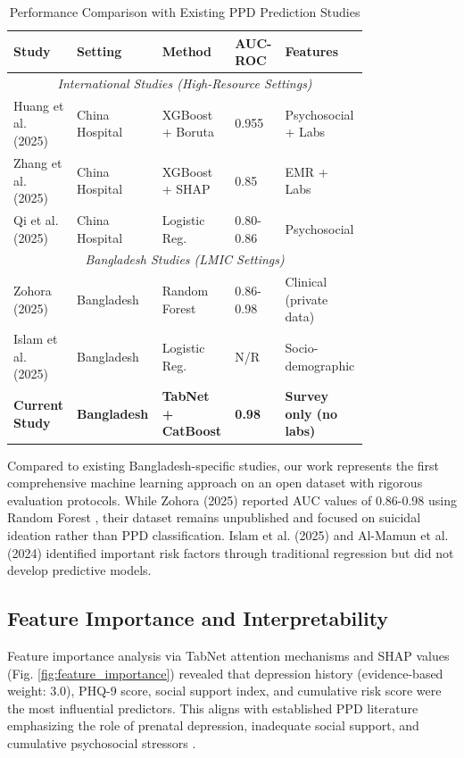 \begin{table}[htbp]
\centering
\caption{Performance Comparison with Existing PPD Prediction Studies}
\label{tab:comparison_literature}
\begin{tabular}{p{0.12\linewidth}p{0.18\linewidth}p{0.15\linewidth}p{0.12\linewidth}p{0.22\linewidth}}
\toprule
\textbf{Study} & \textbf{Setting} & \textbf{Method} & \textbf{AUC-ROC} & \textbf{Features} \\
\midrule
\multicolumn{5}{c}{\textit{International Studies (High-Resource Settings)}} \\
\midrule
Huang et al. (2025) & China Hospital & XGBoost + Boruta & 0.955 & Psychosocial + Labs \\
Zhang et al. (2025) & China Hospital & XGBoost + SHAP & 0.85 & EMR + Labs \\
Qi et al. (2025) & China Hospital & Logistic Reg. & 0.80-0.86 & Psychosocial \\
\midrule
\multicolumn{5}{c}{\textit{Bangladesh Studies (LMIC Settings)}} \\
\midrule
Zohora (2025) & Bangladesh & Random Forest & 0.86-0.98 & Clinical (private data) \\
Islam et al. (2025) & Bangladesh & Logistic Reg. & N/R & Socio-demographic \\
\midrule
\textbf{Current Study} & \textbf{Bangladesh} & \textbf{TabNet + CatBoost} & \textbf{0.98} & \textbf{Survey only (no labs)} \\
\bottomrule
\end{tabular}
\end{table}

Compared to existing Bangladesh-specific studies, our work represents the first comprehensive machine learning approach on an open dataset with rigorous evaluation protocols. While Zohora (2025) reported AUC values of 0.86-0.98 using Random Forest \cite{Zohora2025}, their dataset remains unpublished and focused on suicidal ideation rather than PPD classification. Islam et al. (2025) \cite{Islam2025} and Al-Mamun et al. (2024) \cite{AlMamun2024} identified important risk factors through traditional regression but did not develop predictive models.

\subsection{Feature Importance and Interpretability}

Feature importance analysis via TabNet attention mechanisms and SHAP values (Fig. \ref{fig:feature_importance}) revealed that depression history (evidence-based weight: 3.0), PHQ-9 score, social support index, and cumulative risk score were the most influential predictors. This aligns with established PPD literature emphasizing the role of prenatal depression, inadequate social support, and cumulative psychosocial stressors \cite{Islam2025,AlMamun2024}.

